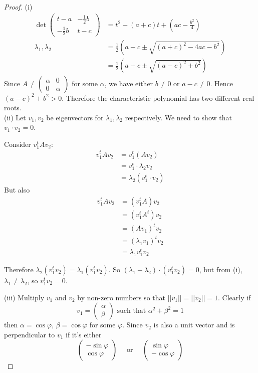 \documentclass[10pt]{scrartcl}
\begin{document}
\begin{proof}
(i)	
\begin{align*}
  \det\begin{pmatrix}
 t-a & -\frac{1}{2}b \\ -\frac{1}{2}b & t-c	
\end{pmatrix} &= t^2 -(a+c)t + (ac - \frac{b^2}{4})\\
\lambda_1,\lambda_2 &= \frac{1}{2}(a + c \pm \sqrt{(a+c)^2 - 4ac - b^2})\\
&= \frac{1}{2}(a+c \pm \sqrt{(a-c)^2 + b^2})
\end{align*}
Since $A \neq \begin{pmatrix}
 \alpha & 0 \\ 0 & \alpha	
 \end{pmatrix}$
 for some $\alpha$, we have either $b \neq 0$ or $a-c \neq 0$. Hence $(a-c)^2 + b^2 > 0$. Therefore the characteristic polynomial has two different real roots.\\
 
(ii) Let $v_1,v_2$ be eigenvectors for $\lambda_1,\lambda_2$ respectively. We need to show that $v_1\cdot v_2 = 0$. 

Consider $v_1^tAv_2$:
\begin{align*}
  v_1^tAv_2 &= v_1^t(Av_2)\\
  &= v_1^t\cdot \lambda_2v_2\\
  &= \lambda_2(v_1^t\cdot v_2)
\end{align*}
But also
\begin{align*}
  v_1^tAv_2 &= (v_1^tA)v_2\\ &= (v_1^tA^t)v_2\\
  &= (Av_1)^tv_2\\ 
  &= (\lambda_1v_1)^tv_2\\
  &= \lambda_1v_1^tv_2
\end{align*}

Therefore $\lambda_2(v_1^tv_2) = \lambda_1(v_1^tv_2)$. So $(\lambda_1-\lambda_2)\cdot(v_1^tv_2) = 0$, but from (i), $\lambda_1\neq \lambda_2$, so $v_1^tv_2 = 0$. 


(iii) Multiply $v_1$ and $v_2$ by non-zero numbers so that $||v_1|| = ||v_2|| = 1$. Clearly if \[v_1 = \begin{pmatrix}
\alpha \\ \beta 	
 \end{pmatrix}\text{ such that }\alpha^2 + \beta^2 = 1\] then $\alpha = \cos\varphi,\, \beta = \cos\varphi$ for some $\varphi$. Since $v_2$ is also a unit vector and is perpendicular to $v_1$ if it's either 
 \[
  \begin{pmatrix}
  -\sin\varphi \\ \cos\varphi 	
  \end{pmatrix}\quad \text{ or } \quad \begin{pmatrix}
  \sin\varphi \\ -\cos\varphi 	
 \end{pmatrix}
\]



\end{proof}
\end{document}
